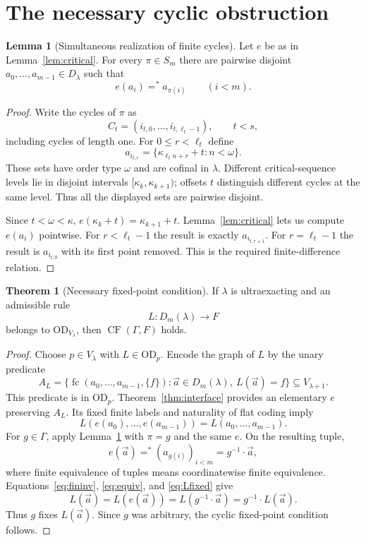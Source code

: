 \documentclass[11pt,letterpaper]{article}
\theoremstyle{definition}
\newtheorem{theorem}[definition]{Theorem}
\newtheorem{lemma}[definition]{Lemma}
\numberwithin{equation}{section}
\newcommand{\OD}{\mathrm{OD}}
\newcommand{\CF}{\operatorname{CF}}
\newcommand{\fc}{\operatorname{fc}}
\newcommand{\Efin}{\mathrel{=^*}}
\begin{document}
\section{The necessary cyclic obstruction}\label{sec:negative}

\begin{lemma}[Simultaneous realization of finite cycles]\label{lem:permutation}
Let $e$ be as in Lemma~\ref{lem:critical}. For every $\pi\in S_m$ there are pairwise disjoint $a_0,\ldots,a_{m-1}\in D_\lambda$ such that
\[
 e(a_i)\Efin a_{\pi(i)}\qquad(i<m).
\]
\end{lemma}

\begin{proof}
Write the cycles of $\pi$ as
\[
 C_t=(i_{t,0},\ldots,i_{t,\ell_t-1}),\qquad t<s,
\]
including cycles of length one. For $0\le r<\ell_t$ define
\begin{equation}\label{eq:criticalsplit}
 a_{i_{t,r}}=\{\kappa_{\ell_t n+r}+t:n<\omega\}.
\end{equation}
These sets have order type $\omega$ and are cofinal in $\lambda$. Different critical-sequence levels lie in disjoint intervals $[\kappa_k,\kappa_{k+1})$; offsets $t$ distinguish different cycles at the same level. Thus all the displayed sets are pairwise disjoint.

Since $t<\omega<\kappa$, $e(\kappa_k+t)=\kappa_{k+1}+t$. Lemma~\ref{lem:critical} lets us compute $e(a_i)$ pointwise. For $r<\ell_t-1$ the result is exactly $a_{i_{t,r+1}}$. For $r=\ell_t-1$ the result is $a_{i_{t,0}}$ with its first point removed. This is the required finite-difference relation.
\end{proof}

\begin{theorem}[Necessary fixed-point condition]\label{thm:necessary}
If $\lambda$ is ultraexacting and an admissible rule
\[
 L:D_m(\lambda)\longrightarrow F
\]
belongs to $\OD_{V_\lambda}$, then $\CF(\Gamma,F)$ holds.
\end{theorem}

\begin{proof}
Choose $p\in V_\lambda$ with $L\in\OD_p$. Encode the graph of $L$ by the unary predicate
\[
 A_L=\{\fc(a_0,\ldots,a_{m-1},\{f\}):
            \vec a\in D_m(\lambda),\ L(\vec a)=f\}
       \subseteq V_{\lambda+1}.
\]
This predicate is in $\OD_p$. Theorem~\ref{thm:interface} provides an elementary $e$ preserving $A_L$. Its fixed finite labels and naturality of flat coding imply
\begin{equation}\label{eq:Lfixed}
 L(e(a_0),\ldots,e(a_{m-1}))=L(a_0,\ldots,a_{m-1}).
\end{equation}
For $g\in\Gamma$, apply Lemma~\ref{lem:permutation} with $\pi=g$ and the same $e$. On the resulting tuple,
\[
 e(\vec a)\Efin (a_{g(i)})_{i<m}=g^{-1}\cdot\vec a,
\]
where finite equivalence of tuples means coordinatewise finite equivalence. Equations~\eqref{eq:fininv}, \eqref{eq:equiv}, and \eqref{eq:Lfixed} give
\[
 L(\vec a)=L(e(\vec a))=L(g^{-1}\cdot\vec a)=g^{-1}\cdot L(\vec a).
\]
Thus $g$ fixes $L(\vec a)$. Since $g$ was arbitrary, the cyclic fixed-point condition follows.
\end{proof}
\end{document}
